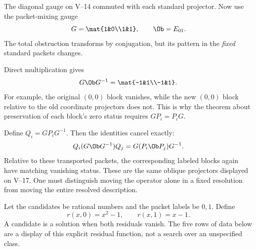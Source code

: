 
The diagonal gauge on V--14 commuted with each standard projector. Now use the packet-mixing gauge
\[
G=\mat{1&0\\1&1},\qquad \Ob=E_{01}.
\]
The total obstruction transforms by conjugation, but its pattern in the \emph{fixed} standard packets changes.


Direct multiplication gives
\[
G\Ob G^{-1}=\mat{-1&1\\-1&1}.
\]
For example, the original $(0,0)$ block vanishes, while the new $(0,0)$ block relative to the old coordinate projectors does not. This is why the theorem about preservation of each block's zero status requires $G P_i=P_iG$.

Define $Q_i=GP_iG^{-1}$. Then the identities cancel exactly:
\[
Q_i(G\Ob G^{-1})Q_j=G(P_i\Ob P_j)G^{-1}.
\]
Relative to these transported packets, the corresponding labeled blocks again have matching vanishing status. These are the same oblique projectors displayed on V--17. One must distinguish moving the operator alone in a fixed resolution from moving the entire resolved description.


Let the candidates be rational numbers and the packet labels be $0,1$. Define
\[
r(x,0)=x^2-1,\qquad r(x,1)=x-1.
\]
A candidate is a solution when both residuals vanish. The five rows of data below are a display of this explicit residual function, not a search over an unspecified class.


